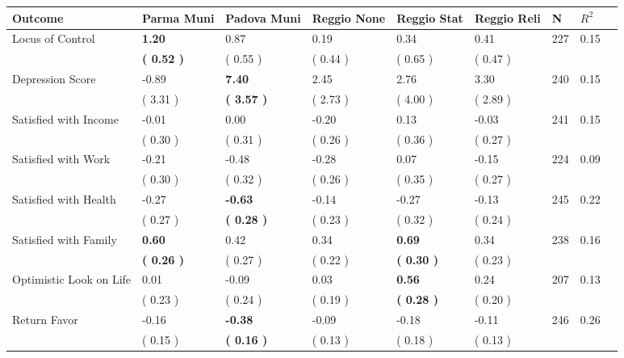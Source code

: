 \begin{tabular}{L{6.2cm} C{1.8cm} C{1.8cm} C{1.8cm} C{1.8cm} C{1.8cm} C{1.8cm} C{0.3cm} C{0.3cm}}
\toprule
 \textbf{Outcome} & \textbf{Parma Muni} & \textbf{Padova Muni} & \textbf{Reggio None} & \textbf{Reggio Stat} & \textbf{Reggio Reli} & \textbf{N} & \textbf{$ R^2$} \\
\midrule
Locus of Control & \textbf{     1.20} &      0.87 &      0.19 &      0.34 &      0.41  & 227 &       0.15 \\ 
 & \textbf{(     0.52 )} & (     0.55 ) & (     0.44 ) & (     0.65 ) & (     0.47 )  & \\
Depression Score &     -0.89 & \textbf{     7.40} &      2.45 &      2.76 &      3.30  & 240 &       0.15 \\ 
 & (     3.31 ) & \textbf{(     3.57 )} & (     2.73 ) & (     4.00 ) & (     2.89 )  & \\
Satisfied with Income &     -0.01 &      0.00 &     -0.20 &      0.13 &     -0.03  & 241 &       0.15 \\ 
 & (     0.30 ) & (     0.31 ) & (     0.26 ) & (     0.36 ) & (     0.27 )  & \\
Satisfied with Work &     -0.21 &     -0.48 &     -0.28 &      0.07 &     -0.15  & 224 &       0.09 \\ 
 & (     0.30 ) & (     0.32 ) & (     0.26 ) & (     0.35 ) & (     0.27 )  & \\
Satisfied with Health &     -0.27 & \textbf{    -0.63} &     -0.14 &     -0.27 &     -0.13  & 245 &       0.22 \\ 
 & (     0.27 ) & \textbf{(     0.28 )} & (     0.23 ) & (     0.32 ) & (     0.24 )  & \\
Satisfied with Family & \textbf{     0.60} &      0.42 &      0.34 & \textbf{     0.69} &      0.34  & 238 &       0.16 \\ 
 & \textbf{(     0.26 )} & (     0.27 ) & (     0.22 ) & \textbf{(     0.30 )} & (     0.23 )  & \\
Optimistic Look on Life &      0.01 &     -0.09 &      0.03 & \textbf{     0.56} &      0.24  & 207 &       0.13 \\ 
 & (     0.23 ) & (     0.24 ) & (     0.19 ) & \textbf{(     0.28 )} & (     0.20 )  & \\
Return Favor &     -0.16 & \textbf{    -0.38} &     -0.09 &     -0.18 &     -0.11  & 246 &       0.26 \\ 
 & (     0.15 ) & \textbf{(     0.16 )} & (     0.13 ) & (     0.18 ) & (     0.13 )  & \\

\end{tabular}
